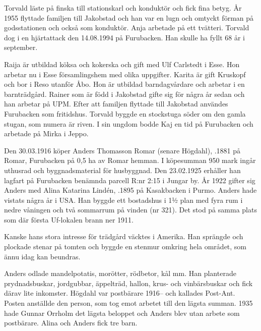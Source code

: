 Torvald läste på finska till stationskarl och konduktör och fick fina betyg. År 1955 flyttade familjen till Jakobstad och han var en lugn och omtyckt förman på godsstationen och också som konduktör. Anja arbetade på ett tvätteri. Torvald dog i en hjärtattack den 14.08.1994 på	Furubacken. Han skulle ha fyllt 68 år i september.

Raija är utbildad köksa och kokerska och gift med Ulf Carlstedt i Esse.	Hon arbetar nu i Esse församlingshem med olika uppgifter. Karita är 	gift Kruskopf och bor i Reso utanför Åbo. Hon är utbildad barndagvårdare och arbetar i en barnträdgård. Rainer som är född i Jakobstad gifte sig för några år sedan och han arbetar på UPM. Efter att familjen flyttade till Jakobstad användes Furubacken	som fritidshus. Torvald byggde en stockstuga söder om den gamla stugan, som numera är riven. I sin ungdom bodde Kaj en tid på Furubacken och arbetade på Mirka i Jeppo.


%
Den 30.03.1916 köper Anders Thomasson Romar (senare Högdahl),	.1881 på Romar, Furubacken på 0,5 ha av Romar hemman. I köpesumman 950 mark	ingår uthusrad och byggnadsmaterial för husbyggnad. Den 23.02.1925 erhåller han lagfart på Furubacken benämnda parcell R:nr 2:15 i Jungar by. År 1922 gifter sig Anders med Alina Katarina Lindén, .1895 på Kasakbacken i Purmo. Anders hade vistats några år i USA. Han byggde ett bostadshus i 1½ plan med fyra rum i nedre våningen och två sommarrum på vinden (nr 321). Det stod på samma plats som där första Uf-lokalen brann ner 1911.

Kanske hans stora intresse för trädgård väcktes i Amerika. Han sprängde och plockade stenar på tomten och byggde en stenmur omkring hela området, som ännu idag kan beundras.


Anders odlade mandelpotatis, morötter, rödbetor, kål mm. Han planterade prydnadsbuskar, jordgubbar, äppelträd, hallon, krus- och vinbärsbuskar och fick därav lite inkomster. Högdahl var postbärare 1916-- och kallades Post-Ant. Posten anställde den person, som tog emot arbetet till den lägsta 	summan. 1935 hade Gunnar Orrholm det lägsta beloppet och Anders blev utan arbete som postbärare. Alina och Anders fick tre barn.
\begin{jhchildren}
  \item {}
  \item {}
  \item {}
\end{jhchildren}

